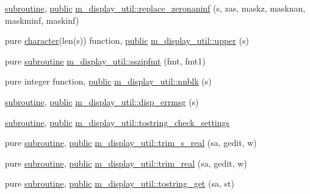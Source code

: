 \begin{DoxyCompactItemize}
\hyperlink{M__stopwatch_83_8txt_acfbcff50169d691ff02d4a123ed70482}{subroutine}, \hyperlink{M__stopwatch_83_8txt_a2f74811300c361e53b430611a7d1769f}{public} \hyperlink{namespacem__display__util_a72816de72f8a35ed93223a4bfd650c9b}{m\+\_\+display\+\_\+util\+::replace\+\_\+zeronaninf} (s, zas, maskz, masknan, maskminf, maskinf)
\item 
pure \hyperlink{option__stopwatch_83_8txt_abd4b21fbbd175834027b5224bfe97e66}{character}(len(s)) function, \hyperlink{M__stopwatch_83_8txt_a2f74811300c361e53b430611a7d1769f}{public} \hyperlink{namespacem__display__util_a6a829115368f9e77c8b35fb1c86ac9c3}{m\+\_\+display\+\_\+util\+::upper} (s)
\item 
pure \hyperlink{M__stopwatch_83_8txt_acfbcff50169d691ff02d4a123ed70482}{subroutine} \hyperlink{namespacem__display__util_a3fa60429ffcc82a33032d718cbe03e87}{m\+\_\+display\+\_\+util\+::sszipfmt} (fmt, fmt1)
\item 
pure integer function, \hyperlink{M__stopwatch_83_8txt_a2f74811300c361e53b430611a7d1769f}{public} \hyperlink{namespacem__display__util_a03c9a1c990a26433230412d78fa46999}{m\+\_\+display\+\_\+util\+::nnblk} (s)
\item 
\hyperlink{M__stopwatch_83_8txt_acfbcff50169d691ff02d4a123ed70482}{subroutine}, \hyperlink{M__stopwatch_83_8txt_a2f74811300c361e53b430611a7d1769f}{public} \hyperlink{namespacem__display__util_a6bfbf2a614c2b0e059d5399eb8dda479}{m\+\_\+display\+\_\+util\+::disp\+\_\+errmsg} (s)
\item 
\hyperlink{M__stopwatch_83_8txt_acfbcff50169d691ff02d4a123ed70482}{subroutine}, \hyperlink{M__stopwatch_83_8txt_a2f74811300c361e53b430611a7d1769f}{public} \hyperlink{namespacem__display__util_a76361afb9f9c3952c258f1f8053ec62a}{m\+\_\+display\+\_\+util\+::tostring\+\_\+check\+\_\+settings}
\item 
pure \hyperlink{M__stopwatch_83_8txt_acfbcff50169d691ff02d4a123ed70482}{subroutine}, \hyperlink{M__stopwatch_83_8txt_a2f74811300c361e53b430611a7d1769f}{public} \hyperlink{namespacem__display__util_ab69265e4c62f2b4c20d1a2b59e25959b}{m\+\_\+display\+\_\+util\+::trim\+\_\+s\+\_\+real} (sa, gedit, w)
\item 
pure \hyperlink{M__stopwatch_83_8txt_acfbcff50169d691ff02d4a123ed70482}{subroutine}, \hyperlink{M__stopwatch_83_8txt_a2f74811300c361e53b430611a7d1769f}{public} \hyperlink{namespacem__display__util_ac428024047b90a34278426d21759faa0}{m\+\_\+display\+\_\+util\+::trim\+\_\+real} (sa, gedit, w)
\item 
pure \hyperlink{M__stopwatch_83_8txt_acfbcff50169d691ff02d4a123ed70482}{subroutine}, \hyperlink{M__stopwatch_83_8txt_a2f74811300c361e53b430611a7d1769f}{public} \hyperlink{namespacem__display__util_a8329f722c059861aa54faa8f7668cc41}{m\+\_\+display\+\_\+util\+::tostring\+\_\+get} (sa, st)

\end{DoxyCompactItemize}
